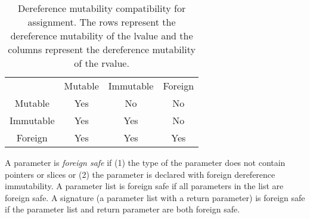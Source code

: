 
\begin{table}
  \centering
  \begin{tabular}{cccc}
              & Mutable & Immutable & Foreign \\
    Mutable   & Yes     & No        & No      \\
    Immutable & Yes     & Yes       & No      \\
    Foreign   & Yes     & Yes       & Yes     \\
    \end{tabular}
  \caption{Dereference mutability compatibility for assignment.  The rows represent the dereference mutability of the lvalue and the columns represent the dereference mutability of the rvalue.\label{assignmut}}
\end{table}

A parameter is \emph{foreign safe} if (1) the type of the parameter does not contain pointers or slices or (2) the parameter is declared with foreign dereference immutability.
A parameter list is foreign safe if all parameters in the list are foreign safe.
A signature (a parameter list with a return parameter) is foreign safe if the parameter list and return parameter are both foreign safe.

